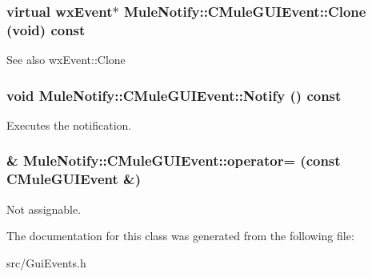 \subsubsection[{Clone}]{\setlength{\rightskip}{0pt plus 5cm}virtual wxEvent$\ast$ MuleNotify::CMuleGUIEvent::Clone (void) const\hspace{0.3cm}{\ttfamily  [inline, virtual]}}\label{classMuleNotify_1_1CMuleGUIEvent_ab1bdfdc503ddc3f8a7acbf1592acb6ba}
\begin{DoxySeeAlso}{See also}
wxEvent::Clone 
\end{DoxySeeAlso}
\subsubsection[{Notify}]{\setlength{\rightskip}{0pt plus 5cm}void MuleNotify::CMuleGUIEvent::Notify () const\hspace{0.3cm}{\ttfamily  [inline]}}\label{classMuleNotify_1_1CMuleGUIEvent_ad748088a39632c09a3bd6f3440c9f622}


Executes the notification. 
\subsubsection[{operator=}]{\& MuleNotify::CMuleGUIEvent::operator= (const {\bf CMuleGUIEvent} \&)\hspace{0.3cm}{\ttfamily  [private]}}\label{classMuleNotify_1_1CMuleGUIEvent_a10e4507303728c5c14e4bd14a3971a15}


Not assignable. 

The documentation for this class was generated from the following file:\begin{DoxyCompactItemize}
\item 
src/GuiEvents.h\end{DoxyCompactItemize}

